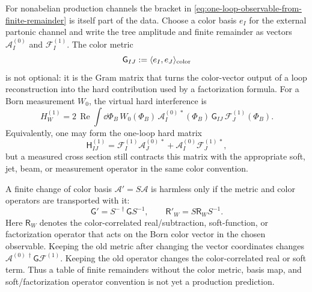 \begin{controlledapproximation}
\label{ca:color-space-hard-function-handoff}
For nonabelian production channels the bracket in
\eqref{eq:one-loop-observable-from-finite-remainder} is itself part of the
data.  Choose a color basis \(e_I\) for the external partonic channel and write
the tree amplitude and finite remainder as vectors
\(\mathcal A_I^{(0)}\) and \(\mathcal F_I^{(1)}\).  The color metric
\[
  \mathsf G_{IJ}:=\langle e_I,e_J\rangle_{\rm color}
\]
is not optional: it is the Gram matrix that turns the color-vector output of a
loop reconstruction into the hard contribution used by a factorization
formula.  For a Born measurement \(W_0\), the virtual hard interference is
\begin{equation}
  H_W^{(1)}
  =
  2\,\operatorname{Re}
  \int\dd\Phi_B\,W_0(\Phi_B)\,
  \mathcal A_I^{(0)\,*}(\Phi_B)\,
  \mathsf G_{IJ}\,
  \mathcal F_J^{(1)}(\Phi_B).
  \label{eq:color-space-hard-interference}
\end{equation}
Equivalently, one may form the one-loop hard matrix
\[
  \mathsf H_{IJ}^{(1)}
  =
  \mathcal F_I^{(1)}\mathcal A_J^{(0)\,*}
  +
  \mathcal A_I^{(0)}\mathcal F_J^{(1)\,*},
\]
but a measured cross section still contracts this matrix with the appropriate
soft, jet, beam, or measurement operator in the same color convention.

A finite change of color basis \(\mathcal A'=S\mathcal A\) is harmless only if
the metric and color operators are transported with it:
\begin{equation}
  \mathsf G'=S^{-\dagger}\mathsf G S^{-1},
  \qquad
  \mathsf R'_W=S\mathsf R_W S^{-1}.
  \label{eq:color-space-basis-transport}
\end{equation}
Here \(\mathsf R_W\) denotes the color-correlated real/subtraction,
soft-function, or factorization operator that acts on the Born color vector in
the chosen observable.  Keeping the old metric after changing the vector
coordinates changes
\(\mathcal A^{(0)\,\dagger}\mathsf G\mathcal F^{(1)}\).  Keeping the old
operator changes the color-correlated real or soft term.  Thus a table of
finite remainders without the color metric, basis map, and soft/factorization
operator convention is not yet a production prediction.


\end{controlledapproximation}

